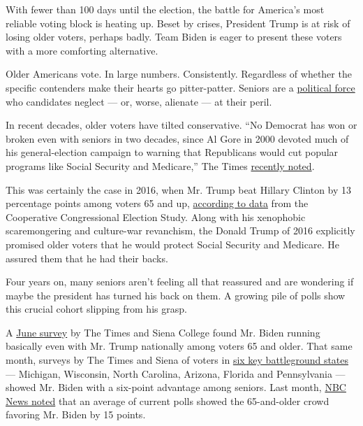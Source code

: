 With fewer than 100 days until the election, the battle for America's
most reliable voting block is heating up. Beset by crises, President
Trump is at risk of losing older voters, perhaps badly. Team Biden is
eager to present these voters with a more comforting alternative.

Older Americans vote. In large numbers. Consistently. Regardless of
whether the specific contenders make their hearts go pitter-patter.
Seniors are a
\href{https://www.nytimes.com/2020/03/27/us/politics/biden-trump-seniors.html}{political
force} who candidates neglect --- or, worse, alienate --- at their
peril.

In recent decades, older voters have tilted conservative. ``No Democrat
has won or broken even with seniors in two decades, since Al Gore in
2000 devoted much of his general-election campaign to warning that
Republicans would cut popular programs like Social Security and
Medicare,'' The Times
\href{https://www.nytimes.com/2020/06/28/us/politics/trump-approval-older-voters-coronavirus.html}{recently
noted}.

This was certainly the case in 2016, when Mr. Trump beat Hillary Clinton
by 13 percentage points among voters 65 and up,
\href{https://fivethirtyeight.com/features/are-older-voters-turning-away-from-trump/}{according
to data} from the Cooperative Congressional Election Study. Along with
his xenophobic scaremongering and culture-war revanchism, the Donald
Trump of 2016 explicitly promised older voters that he would protect
Social Security and Medicare. He assured them that he had their backs.

Four years on, many seniors aren't feeling all that reassured and are
wondering if maybe the president has turned his back on them. A growing
pile of polls show this crucial cohort slipping from his grasp.

A
\href{https://www.nytimes.com/2020/06/24/us/politics/trump-biden-poll-nyt-upshot-siena-college.html}{June
survey} by The Times and Siena College found Mr. Biden running basically
even with Mr. Trump nationally among voters 65 and older. That same
month, surveys by The Times and Siena of voters in
\href{https://www.nytimes.com/2020/06/25/upshot/poll-2020-biden-battlegrounds.html}{six
key battleground states} --- Michigan, Wisconsin, North Carolina,
Arizona, Florida and Pennsylvania --- showed Mr. Biden with a six-point
advantage among seniors. Last month,
\href{https://www.nbcnews.com/politics/2020-election/who-s-behind-trump-s-big-polling-deficit-two-key-n1234605}{NBC
News noted} that an average of current polls showed the 65-and-older
crowd favoring Mr. Biden by 15 points.

